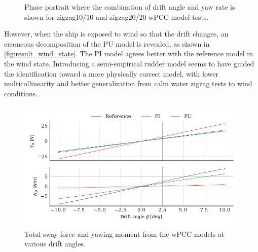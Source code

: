 \begin{figure}[h]
  \centering
  
  \caption{Phase portrait where the combination of drift angle and yaw rate is shown for zigzag10/10 and zigzag20/20 wPCC model tests.}
  \label{fig:phase_portrait}
\end{figure}
However, when the ship is exposed to wind so that the drift changes, an erroneous decomposition of the PU model is revealed, as shown in \autoref{fig:result_wind_state}. The PI model agrees better with the reference model in the wind state. Introducing a semi-empirical rudder model seems to have guided the identification toward a more physically correct model, with lower multicollinearity and better generalization from calm water zigzag tests to wind conditions.
\begin{figure}[h!]
    \includegraphics{kappa/images/result_wind_state.forces.pdf}
    \caption{Total sway force and yawing moment from the wPCC models at various drift angles.}
    \label{fig:result_wind_state}
\end{figure}
\FloatBarrier
\clearpage